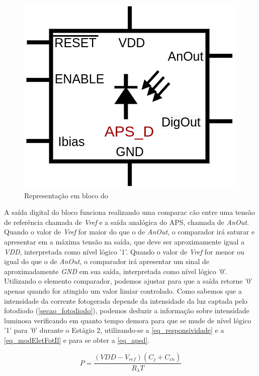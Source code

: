 \begin{figure}[htb]
 \centering
    \centering
    \caption{Representa{\c c}\~ao em bloco do \NomeBloco} \label{\NomeSFig}
    \includegraphics[scale=0.5]{Circuitos/APS_digitalized_block.png}
\end{figure}

A sa\'ida digital do bloco funciona realizando uma compara{c c}\~ao entre uma tens\~ao de refer\^encia chamada de \emph{Vref} e a sa\'ida anal\'ogica do APS, chamada de \emph{AnOut}. Quando o valor de \emph{Vref} for maior do que o de \emph{AnOut}, o comparador ir\'a saturar e apresentar em a m\'axima tens\~ao na sa\'ida, que deve ser aproximamente igual a \emph{VDD}, interpretada como n\'ivel l\'ogico '1'. Quando o valor de \emph{Vref} for menor ou igual do que o de \emph{AnOut}, o comparador ir\'a apresentar um sinal de aproximadamente \emph{GND} em sua sa\'ida, interpretada como n\'ivel l\'ogico '0'.
Utilizando o elemento comparador, podemos ajustar para que a sa\'ida retorne '0' apenas quando for atingido um valor limiar controlado. Como sabemos que a intensidade da corrente fotogerada depende da intensidade da luz captada pelo fotodiodo (\autoref{secao_fotodiodo}), podemos deduzir a informa{\c c}\~ao sobre intensidade luminosa verificando em quanto tempo demora para que se mude de n\'ivel l\'ogico '1' para '0' durante o Est\'agio 2, utilizando-se a \autoref{eq_responsividade} e a \autoref{eq_modEletFotIl} e para se obter a \autoref{eq_apsd}.

\begin{equation}
    \label{eq_apsd}
    P = \frac{(VDD-V_{ref})(C_{j}+C_{cn})}{R_{\lambda}T}
\end{equation}

